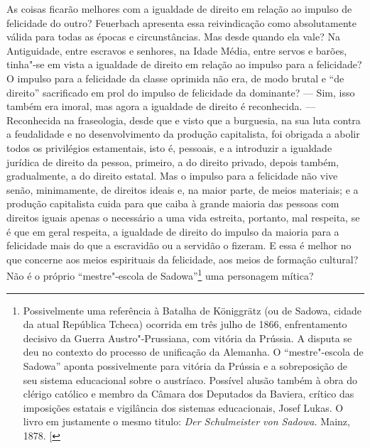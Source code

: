 As coisas ficarão melhores com a igualdade de direito em relação ao
impulso de felicidade do
outro? Feuerbach 
apresenta essa reivindicação como absolutamente válida para todas as
épocas e circunstâncias. Mas desde quando ela vale? Na Antiguidade,
entre escravos e senhores, na Idade Média, entre servos e barões,
tinha"-se em vista a igualdade de direito em relação ao impulso para a
felicidade? O impulso para a felicidade da classe oprimida não era, de
modo brutal e ``de direito'' sacrificado em prol do impulso de
felicidade da dominante? --- Sim, isso também era imoral, mas agora a
igualdade de direito é reconhecida. --- Reconhecida na fraseologia, desde
que e visto que a burguesia, na sua luta contra a feudalidade e no
desenvolvimento da produção capitalista, foi obrigada a abolir todos os
privilégios estamentais, isto é, pessoais, e a introduzir a igualdade
jurídica de direito da pessoa, primeiro, a do direito privado, depois
também, gradualmente, a do direito estatal. Mas o impulso para a
felicidade não vive senão, minimamente, de direitos ideais e, na maior
parte, de meios materiais; e a produção capitalista cuida para que caiba
à grande maioria das pessoas com direitos iguais apenas o necessário a
uma vida estreita, portanto, mal respeita, se é que em geral respeita, a
igualdade de direito do impulso da maioria para a felicidade mais do que
a escravidão ou a servidão o fizeram. E essa é melhor no que concerne
aos meios espirituais da felicidade, aos meios de formação cultural? Não
é o próprio ``mestre"-escola de Sadowa''\footnote{Possivelmente uma referência à Batalha de
  Königgrätz (ou de Sadowa, cidade da atual República Tcheca) ocorrida
  em três
  julho de 1866,
  enfrentamento decisivo
  da Guerra Austro"-Prussiana, com vitória
  da Prússia.
  A disputa se deu no contexto do processo de unificação da Alemanha. O
  ``mestre"-escola de Sadowa'' aponta possivelmente para vitória da
  Prússia e a sobreposição de seu sistema educacional sobre o austríaco.
  Possível alusão também à obra do clérigo católico e membro da Câmara
  dos Deputados da Baviera, crítico das imposições estatais e vigilância
  dos sistemas educacionais, Josef Lukas. O livro em justamente o mesmo
  titulo: \emph{Der Schulmeister von Sadowa.} Mainz, 1878. {[}\versal{N.\,T.}{]}} uma
personagem mítica?

